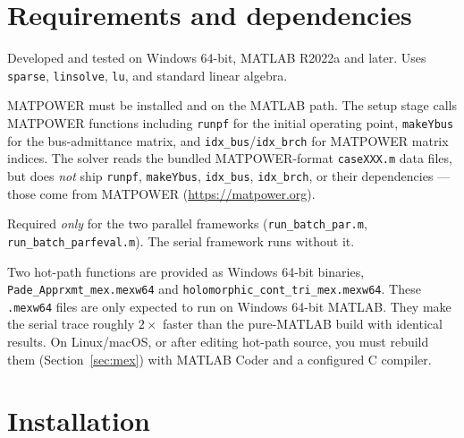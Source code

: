 \documentclass[11pt,a4paper]{article}
\newcommand{\code}[1]{\texttt{#1}}
\begin{document}
\section{Requirements and dependencies}

\begin{description}[leftmargin=0em,style=nextline]
\item[MATLAB (required).] Developed and tested on Windows 64-bit, MATLAB R2022a and
      later. Uses \code{sparse}, \code{linsolve}, \code{lu}, and standard linear algebra.
\item[MATPOWER (required).] MATPOWER must be installed and on the MATLAB path. The setup
      stage calls MATPOWER functions including \code{runpf} for the initial operating
      point, \code{makeYbus} for the bus-admittance matrix, and
      \code{idx_bus}/\code{idx_brch} for MATPOWER matrix indices. The solver reads the
      bundled MATPOWER-format \code{caseXXX.m} data files, but does \emph{not} ship
      \code{runpf}, \code{makeYbus}, \code{idx_bus}, \code{idx_brch}, or their
      dependencies --- those come from MATPOWER (\url{https://matpower.org}).
\item[Parallel Computing Toolbox (optional).] Required \emph{only} for the two parallel
      frameworks (\code{run_batch_par.m}, \code{run_batch_parfeval.m}). The serial
      framework runs without it.
\item[Compiled MEX (shipped).] Two hot-path functions are provided as Windows 64-bit
      binaries, \code{Pade_Apprxmt_mex.mexw64} and \code{holomorphic_cont_tri_mex.mexw64}.
      These \code{.mexw64} files are only expected to run on Windows 64-bit MATLAB. They
      make the serial trace roughly $2\times$ faster than the pure-MATLAB build with
      identical results. On Linux/macOS, or after editing hot-path source, you must
      rebuild them (Section~\ref{sec:mex}) with MATLAB Coder and a configured C compiler.
\end{description}

\section{Installation}
\end{document}
